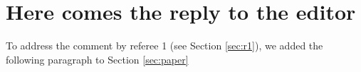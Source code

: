 \section{Here comes the reply to the editor\label{sec:ed}}

To address the comment by referee 1 (see Section \ref{sec:r1}), we added the following paragraph to Section \ref{sec:paper}

\begin{quote}
{\em {}}
\end{quote}

